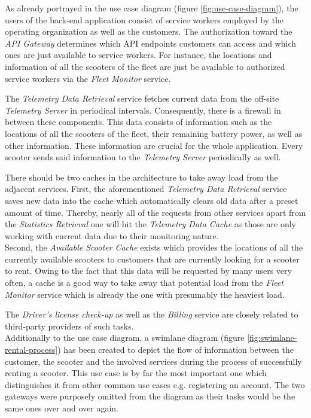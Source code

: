 \documentclass[12pt,a4paper,twoside]{report}
\begin{document}
As already portrayed in the use case diagram (figure \ref{fig:use-case-diagram}),
the users of the back-end application consist of service workers employed
by the operating organization as well as the customers.
The authorization toward the \textit{API Gateway} determines which
API endpoints customers can access and which ones are just available to
service workers. For instance, the locations and information of all the scooters
of the fleet are just be available to authorized service workers via the
\textit{Fleet Monitor} service.

The \textit{Telemetry Data Retrieval} service fetches current data from the
off-site \textit{Telemetry Server} in periodical intervals.
Consequently, there is a firewall in between these components.
This data consists of information such as the locations of all the scooters
of the fleet, their remaining battery power, as well as other information.
These information are crucial for the whole application.
Every scooter sends said information to the \textit{Telemetry Server}
periodically as well.

There should be two caches in the architecture to take away load from the
adjacent services. First, the aforementioned \textit{Telemetry Data Retrieval}
service saves new data into the cache which automatically clears old
data after a preset amount of time. Thereby, nearly all of the requests from
other services apart from the \textit{Statistics Retrieval} one will hit the
\textit{Telemetry Data Cache} as those are only working with current data due
to their monitoring nature.\\
Second, the \textit{Available Scooter Cache} exists which provides the locations
of all the currently available scooters to customers that are currently looking
for a scooter to rent. Owing to the fact that this data will be requested by
many users very often, a cache is a good way to take away that potential load
from the \textit{Fleet Monitor} service which is already the one with
presumably the heaviest load.

The \textit{Driver's license check-up} as well as the \textit{Billing} service
are closely related to third-party providers of such tasks.\\

Additionally to the use case diagram, a swimlane diagram
(figure \ref{fig:swimlane-rental-process}) has been created to depict
the flow of information between the customer, the scooter and the
involved services during the process of successfully renting a scooter.
This use case is by far the most important one which distinguishes it
from other common use cases e.g. registering an account.
The two gateways were purposely omitted from the diagram as their tasks would
be the same ones over and over again.
\end{document}
